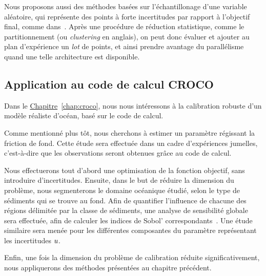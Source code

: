 \documentclass[../../Main_ManuscritThese.tex]{subfiles}
\newcommand{\frchap}[1]{\hyperref[#1]{Chapitre}~\ref{#1}}
\begin{document}
Nous proposons aussi des méthodes basées sur l'échantillonage d'une
variable aléatoire, qui représente des points à forte incertitudes par
rapport à l'objectif final, comme
dans~\cite{echard_ak-mcs_2011,razaaly_rare_2019}. Après une procédure
de réduction statistique, comme le partitionnement (ou
\emph{clustering} en anglais), on peut donc évaluer et ajouter au plan
d'expérience un \emph{lot} de points, et ainsi prendre avantage du
parallélisme quand une telle architecture est disponible.


\subsection*{Application au code de calcul CROCO}
Dans le \frchap{chap:croco}, nous nous intéressons à la calibration
robuste d'un modèle réaliste d'océan, basé sur le code de
calcul.

Comme mentionné plus tôt, nous cherchons à estimer un paramètre
régissant la friction de fond. Cette étude sera effectuée dans un
cadre d'expériences jumelles, c'est-à-dire que les observations seront
obtenues grâce au code de calcul.

Nous effectuerons tout d'abord une optimisation de la fonction
objectif, sans introduire d'incertitudes. Ensuite, dans le but de
réduire la dimension du problème, nous segmenterons le domaine
océanique étudié, selon le type de sédiments qui se trouve au
fond. Afin de quantifier l'influence de chacune des régions délimitée
par la classe de sédiments, une analyse de sensibilité globale sera
effectuée, afin de calculer les indices de Sobol'
correspondants~\cite{sobol_global_2001,iooss_revue_2011}. Une étude
similaire sera menée pour les différentes composantes du paramètre
représentant les incertitudes $u$.

Enfin, une fois la dimension du problème de calibration réduite
significativement, nous appliquerons des méthodes présentées au
chapitre précédent.





\etoile
\vfill
\end{document}
